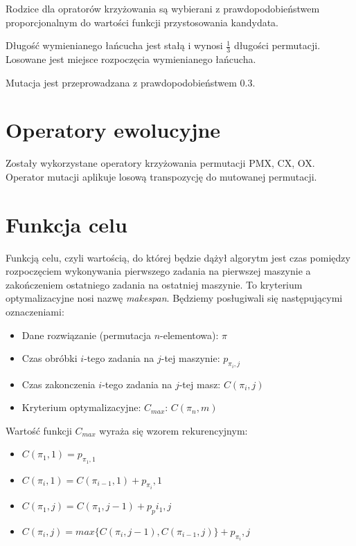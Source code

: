 \documentclass[12pt]{article}
\begin{document}
Rodzice dla opratorów krzyżowania są wybierani z prawdopodobieństwem
proporcjonalnym do wartości funkcji przystosowania kandydata.

Długość wymienianego łańcucha jest stałą i wynosi $\frac{1}{3}$ długości
permutacji. Losowane jest miejsce rozpoczęcia wymienianego łańcucha.

Mutacja jest przeprowadzana z prawdopodobieństwem 0.3.

\section{Operatory ewolucyjne}

Zostały wykorzystane operatory krzyżowania permutacji PMX, CX, OX.
Operator mutacji aplikuje losową transpozycję do mutowanej permutacji.

\section{Funkcja celu}

Funkcją celu, czyli wartością, do której będzie dążył algorytm jest czas
pomiędzy rozpoczęciem wykonywania pierwszego zadania na pierwszej maszynie a
zakończeniem ostatniego zadania na ostatniej maszynie. To kryterium optymalizacyjne
nosi nazwę {\em makespan}. Będziemy posługiwali się następującymi oznaczeniami:

\begin{itemize}
  \item Dane rozwiązanie (permutacja $n$-elementowa): $\pi$
  \item Czas obróbki $i$-tego zadania na $j$-tej maszynie: $p_{\pi_i,j}$
  \item Czas zakonczenia $i$-tego zadania na $j$-tej masz: $C(\pi_i,j)$
  \item Kryterium optymalizacyjne: $C_{max}$: $C(\pi_n,m)$
\end{itemize}

Wartość funkcji $C_{max}$ wyraża się wzorem rekurencyjnym:

\begin{itemize}
  \item $C(\pi_1,1) = p_{\pi_1,1}$
  \item $C(\pi_i,1) = C(\pi_{i-1},1) + p_{\pi_i},1$
  \item $C(\pi_1,j) = C(\pi_1,j-1) + p_pi_1,j$
  \item $C(\pi_i,j) = max\{C(\pi_i,j-1),C(\pi_{i-1},j)\} + p_{\pi_i},j$
\end{itemize}
\end{document}
